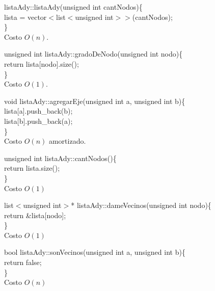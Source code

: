 \documentclass[a4paper]{article}
\begin{document}
\begin{algorithm}[h!]
listaAdy::listaAdy(unsigned int cantNodos)\{\\
	lista = vector$<$list$<$unsigned int$> >$(cantNodos);\\
\}\\
Costo $O(n)$.
\end{algorithm}


\begin{algorithm}[h!]
unsigned int listaAdy::gradoDeNodo(unsigned int nodo)\{\\
	return lista[nodo].size();\\
\}\\
Costo $O(1)$.
\end{algorithm}


\begin{algorithm}[h!]
void listaAdy::agregarEje(unsigned int a, unsigned int b)\{\\
	lista[a].push_back(b);\\
	lista[b].push_back(a);\\
\}\\
Costo $O(n)$ amortizado.
\end{algorithm}

\begin{algorithm}[h!]
unsigned int listaAdy::cantNodos()\{\\
	return lista.size();\\
\}\\
Costo $O(1)$
\end{algorithm}

\begin{algorithm}[h!]
list$<$unsigned int$>$* listaAdy::dameVecinos(unsigned int nodo)\{\\
	return \&lista[nodo];\\
\}\\
Costo $O(1)$
\end{algorithm}

\begin{algorithm}[h!]
bool listaAdy::sonVecinos(unsigned int a, unsigned int b)\{\\
	return false;\\
\}\\
Costo $O(n)$
\end{algorithm}
\end{document}
